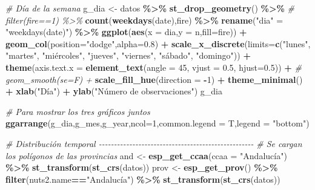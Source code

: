 \documentclass[12pt,a4paper,]{book}
\newenvironment{Shaded}{\begin{snugshade}}{\end{snugshade}}
\newcommand{\AttributeTok}[1]{\textcolor[rgb]{0.13,0.29,0.53}{#1}}
\newcommand{\CommentTok}[1]{\textcolor[rgb]{0.56,0.35,0.01}{\textit{#1}}}
\newcommand{\DecValTok}[1]{\textcolor[rgb]{0.00,0.00,0.81}{#1}}
\newcommand{\FloatTok}[1]{\textcolor[rgb]{0.00,0.00,0.81}{#1}}
\newcommand{\FunctionTok}[1]{\textcolor[rgb]{0.13,0.29,0.53}{\textbf{#1}}}
\newcommand{\NormalTok}[1]{#1}
\newcommand{\OtherTok}[1]{\textcolor[rgb]{0.56,0.35,0.01}{#1}}
\newcommand{\SpecialCharTok}[1]{\textcolor[rgb]{0.81,0.36,0.00}{\textbf{#1}}}
\newcommand{\StringTok}[1]{\textcolor[rgb]{0.31,0.60,0.02}{#1}}
\numberwithin{dummy}{section}
\theoremstyle{ocrenumbox}
\theoremstyle{blacknumex}
\theoremstyle{blacknumbox}
\theoremstyle{ocrenum}
\theoremstyle{ocrenum}
\begin{document}
\begin{Shaded}
\begin{Highlighting}[]
\CommentTok{\# Día de la semana}
\NormalTok{g\_dia }\OtherTok{\textless{}{-}}\NormalTok{ datos }\SpecialCharTok{\%\textgreater{}\%} 
  \FunctionTok{st\_drop\_geometry}\NormalTok{() }\SpecialCharTok{\%\textgreater{}\%} 
  \CommentTok{\# filter(fire==1) \%\textgreater{}\% }
  \FunctionTok{count}\NormalTok{(}\FunctionTok{weekdays}\NormalTok{(date),fire) }\SpecialCharTok{\%\textgreater{}\%} 
  \FunctionTok{rename}\NormalTok{(}\StringTok{"dia"} \OtherTok{=} \StringTok{"weekdays(date)"}\NormalTok{) }\SpecialCharTok{\%\textgreater{}\%} 
  \FunctionTok{ggplot}\NormalTok{(}\FunctionTok{aes}\NormalTok{(}\AttributeTok{x =}\NormalTok{ dia,}\AttributeTok{y =}\NormalTok{ n,}\AttributeTok{fill=}\NormalTok{fire)) }\SpecialCharTok{+}
  \FunctionTok{geom\_col}\NormalTok{(}\AttributeTok{position=}\StringTok{"dodge"}\NormalTok{,}\AttributeTok{alpha=}\FloatTok{0.8}\NormalTok{) }\SpecialCharTok{+}
  \FunctionTok{scale\_x\_discrete}\NormalTok{(}\AttributeTok{limits=}\FunctionTok{c}\NormalTok{(}\StringTok{"lunes"}\NormalTok{, }\StringTok{"martes"}\NormalTok{, }\StringTok{"miércoles"}\NormalTok{, }\StringTok{"jueves"}\NormalTok{, }\StringTok{"viernes"}\NormalTok{, }\StringTok{"sábado"}\NormalTok{, }\StringTok{"domingo"}\NormalTok{)) }\SpecialCharTok{+}
  \FunctionTok{theme}\NormalTok{(}\AttributeTok{axis.text.x =} \FunctionTok{element\_text}\NormalTok{(}\AttributeTok{angle =} \DecValTok{45}\NormalTok{, }\AttributeTok{vjust =} \FloatTok{0.5}\NormalTok{, }\AttributeTok{hjust=}\FloatTok{0.5}\NormalTok{)) }\SpecialCharTok{+}
 \CommentTok{\# geom\_smooth(se=F) +}
  \FunctionTok{scale\_fill\_hue}\NormalTok{(}\AttributeTok{direction =} \SpecialCharTok{{-}}\DecValTok{1}\NormalTok{) }\SpecialCharTok{+}
  \FunctionTok{theme\_minimal}\NormalTok{() }\SpecialCharTok{+}
  \FunctionTok{xlab}\NormalTok{(}\StringTok{"Día"}\NormalTok{) }\SpecialCharTok{+}
  \FunctionTok{ylab}\NormalTok{(}\StringTok{"Número de observaciones"}\NormalTok{)}
\NormalTok{g\_dia}

\CommentTok{\# Para mostrar los tres gráficos juntos}
\FunctionTok{ggarrange}\NormalTok{(g\_dia,g\_mes,g\_year,}\AttributeTok{ncol=}\DecValTok{1}\NormalTok{,}\AttributeTok{common.legend =}\NormalTok{ T,}\AttributeTok{legend =} \StringTok{"bottom"}\NormalTok{)}

\CommentTok{\# Distribución temporal {-}{-}{-}{-}{-}{-}{-}{-}{-}{-}{-}{-}{-}{-}{-}{-}{-}{-}{-}{-}{-}{-}{-}{-}{-}{-}{-}{-}{-}{-}{-}{-}{-}{-}{-}{-}{-}{-}{-}{-}{-}{-}{-}{-}{-}{-}{-}{-}{-}{-}{-}}
\CommentTok{\# Se cargan los polígonos de las provincias}
\NormalTok{and }\OtherTok{\textless{}{-}} \FunctionTok{esp\_get\_ccaa}\NormalTok{(}\AttributeTok{ccaa =} \StringTok{"Andalucía"}\NormalTok{) }\SpecialCharTok{\%\textgreater{}\%} \FunctionTok{st\_transform}\NormalTok{(}\FunctionTok{st\_crs}\NormalTok{(datos))}
\NormalTok{prov }\OtherTok{\textless{}{-}} \FunctionTok{esp\_get\_prov}\NormalTok{() }\SpecialCharTok{\%\textgreater{}\%} \FunctionTok{filter}\NormalTok{(nuts2.name}\SpecialCharTok{==}\StringTok{"Andalucía"}\NormalTok{) }\SpecialCharTok{\%\textgreater{}\%} \FunctionTok{st\_transform}\NormalTok{(}\FunctionTok{st\_crs}\NormalTok{(datos))}


\end{Highlighting}
\end{Shaded}
\end{document}
